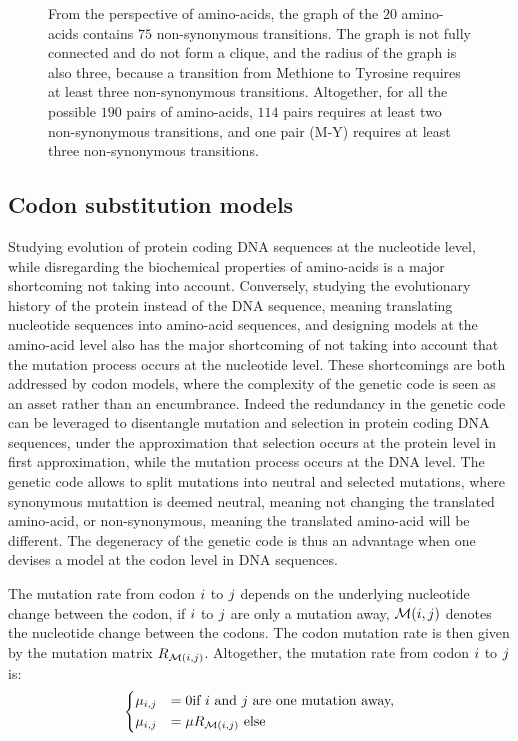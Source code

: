 \begin{figure}[htb!]
{		From the perspective of amino-acids, the graph of the $20$ amino-acids contains $75$ non-synonymous transitions. 
		The graph is not fully connected and do not form a clique, and the radius of the graph is also three, because a transition from Methione to Tyrosine requires at least three non-synonymous transitions. 
		Altogether, for all the possible $190$ pairs of amino-acids, $114$ pairs requires at least two non-synonymous transitions, and one pair (M-Y) requires at least three non-synonymous transitions.
	}
\end{figure}
\subsection{Codon substitution models}
Studying evolution of protein coding \acrshort{DNA} sequences at the nucleotide level, while disregarding the biochemical properties of amino-acids is a major shortcoming not taking into account.
Conversely, studying the evolutionary history of the protein instead of the \acrshort{DNA} sequence, meaning translating nucleotide sequences into amino-acid sequences, and designing models at the amino-acid level also has the major shortcoming of not taking into account that the mutation process occurs at the nucleotide level.
These shortcomings are both addressed by \gls{codon} models, where the complexity of the genetic code is seen as an asset rather than an encumbrance.
Indeed the redundancy in the genetic code can be leveraged to disentangle mutation and selection in protein coding \acrshort{DNA} sequences, under the approximation that selection occurs at the protein level in first approximation, while the mutation process occurs at the \acrshort{DNA} level.
The genetic code allows to split mutations into \gls{neutral} and selected mutations, where synonymous mutattion is deemed neutral, meaning not changing the translated amino-acid, or non-synonymous, meaning the translated amino-acid will be different.
The degeneracy of the genetic code is thus an advantage when one devises a model at the \gls{codon} level in \acrshort{DNA} sequences.

The mutation rate from \gls{codon} ${i}$ to ${j}$ depends on the underlying nucleotide change between the \gls{codon}, if ${i}$ to ${j}$ are only a mutation away, $\mathcal{M}({i}, {j})$ denotes the nucleotide change between the codons. The \gls{codon} mutation rate is then given by the mutation matrix ${R_{\mathcal{M}({i}, {j})}}$. Altogether, the mutation rate from \gls{codon} ${i}$ to ${j}$ is:
\begin{equation}
\begin{dcases}
\mu_{{i}, {j}} & = 0 \text{if ${i}$ and ${j}$ are one mutation away,} \\
\mu_{{i}, {j}} & = \mu R_{\mathcal{M}({i}, {j})} \text{ else }
\end{dcases}
\end{equation}


